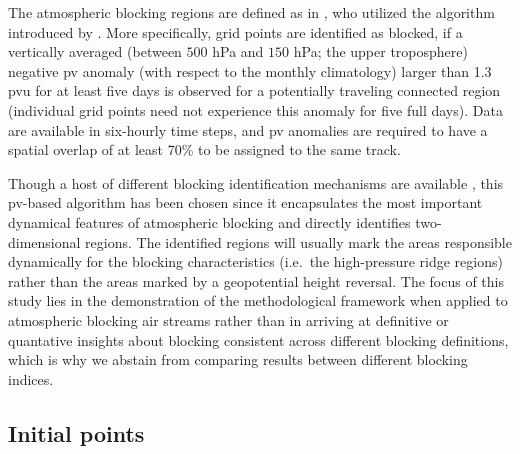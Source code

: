 The atmospheric blocking regions are defined as in \textcite{pfahlQuantifyingRelevanceAtmospheric2012}, who utilized the algorithm introduced by \textcite{schwierzPerspicaciousIndicatorsAtmospheric2004}. More specifically, grid points are identified as blocked, if a vertically averaged (between $500$ hPa and $150$ hPa; the upper troposphere) negative \gls{pv} anomaly (with respect to the monthly climatology) larger than 1.3 \gls{pvu} for at least five days is observed for a potentially traveling connected region (individual grid points need not experience this anomaly for five full days). Data are available in six-hourly time steps, and \gls{pv} anomalies are required to have a spatial overlap of at least 70\% to be assigned to the same track.

Though a host of different blocking identification mechanisms are available \parencite{pinheiroAtmosphericBlockingIntercomparison2019}, this \gls{pv}-based algorithm has been chosen since it encapsulates the most important dynamical features of atmospheric blocking \parencite{schwierzPerspicaciousIndicatorsAtmospheric2004, croci-maspoliMultifacetedClimatologyAtmospheric2007} and directly identifies two-dimensional regions.  The identified regions will usually mark the areas responsible dynamically for the blocking characteristics (i.e.~the high-pressure ridge regions) rather than the areas marked by a geopotential height reversal. The focus of this study lies in the demonstration of the methodological framework when applied to atmospheric blocking air streams rather than in arriving at definitive or quantative insights about blocking consistent across different blocking definitions, which is why we abstain from comparing results between different blocking indices.

\subsection{Initial points} \label{sec:CS_startPoints}

